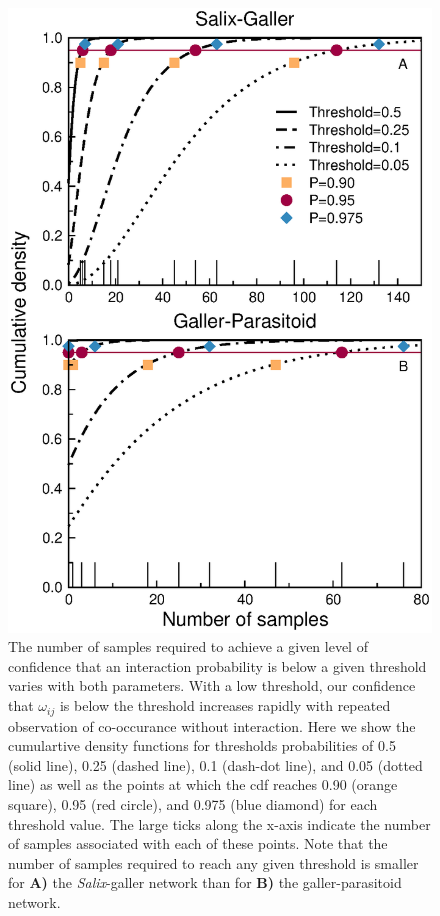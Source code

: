 \documentclass[12pt]{article}
\begin{document}
      \begin{figure}[ht]
        \caption{The number of samples required to achieve a given level of confidence that an interaction probability is below a given threshold varies with both parameters. With a low threshold, our confidence that $\omega_{ij}$ is below the threshold increases rapidly with repeated observation of co-occurance without interaction. Here we show the cumulartive density functions for thresholds probabilities of 0.5 (solid line), 0.25 (dashed line), 0.1 (dash-dot line), and 0.05 (dotted line) as well as the points at which the cdf reaches 0.90 (orange square), 0.95 (red circle), and 0.975 (blue diamond) for each threshold value. The large ticks along the x-axis indicate the number of samples associated with each of these points. Note that the number of samples required to reach any given threshold is smaller for \textbf{A)} the \emph{Salix}-galler network than for \textbf{B)} the galler-parasitoid network.}
        \label{Salix_cdfs}
        \includegraphics[width=.8\textwidth]{figures/Salix_Galler_samples_and_cdfs.eps}

        \end{figure}
\end{document}
